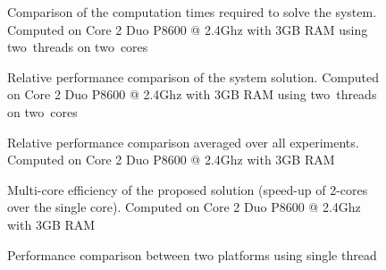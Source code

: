 \begin{figure}[h]
\centerline{}
\caption{Comparison of the computation times required to solve the system. Computed on Core 2 Duo P8600 @ 2.4Ghz with 3GB RAM using two~threads on two~cores}
\label{fig:multiSystemc2CT}
\end{figure}

\begin{figure}[h]
\centerline{}
\caption{Relative performance comparison of the system solution. Computed on Core 2 Duo P8600 @ 2.4Ghz with 3GB RAM using two~threads on two~cores}
\label{fig:multiSystemc2}
\end{figure}

\begin{figure}[h]
\centerline{}
\caption{Relative performance comparison averaged over all experiments. Computed on Core 2 Duo P8600 @ 2.4Ghz with 3GB RAM}
\label{fig:averagec2}
\end{figure}

\begin{figure}[h]
\centerline{}
\caption{Multi-core efficiency of the proposed solution (speed-up of 2-cores over the single core). Computed on Core 2 Duo P8600 @ 2.4Ghz with 3GB RAM}
\label{fig:mcEfficiencyc2}
\end{figure}

\begin{figure}[h]
\centerline{}
\caption{Performance comparison between two platforms using single thread}
\label{fig:perfCompSystem}
\end{figure}

